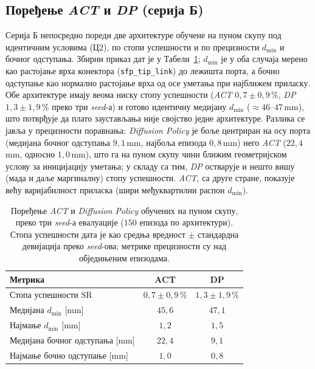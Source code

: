 \documentclass[12pt, a4paper]{article}
\begin{document}
\subsection{Поређење \textit{ACT} и \textit{DP} (серија Б)}
\label{subsec:rez_serija_b}

Серија Б непосредно пореди две архитектуре обучене на пуном скупу под идентичним условима (Ц2), по стопи успешности и по прецизности $d_{\min}$ и бочног одступања.
Збирни приказ дат је у Табели~\ref{tab:rez_serija_b}; $d_{\min}$ је у оба случаја мерено као растојање врха конектора (\texttt{sfp\_tip\_link}) до лежишта порта, а бочно одступање као нормално растојање врха од осе уметања при најближем приласку.
Обе архитектуре имају веома ниску стопу успешности (\textit{ACT} $0{,}7\pm 0{,}9\,\%$, \textit{DP} $1{,}3\pm 1{,}9\,\%$ преко три \textit{seed}-а) и готово идентичну медијану $d_{\min}$ ($\approx 46$–$47$\,mm), што потврђује да плато заустављања није својство једне архитектуре.
Разлика се јавља у прецизности поравнања: \textit{Diffusion Policy} је боље центриран на осу порта (медијана бочног одступања $9{,}1$\,mm, најбоља епизода $0{,}8$\,mm) него \textit{ACT} ($22{,}4$\,mm, односно $1{,}0$\,mm), што га на пуном скупу чини ближим геометријском услову за иницијацију уметања; у складу са тим, \textit{DP} остварује и нешто вишу (мада и даље маргиналну) стопу успешности.
\textit{ACT}, са друге стране, показује већу варијабилност приласка (шири међуквартилни распон $d_{\min}$).

\begin{table}[htbp]
    \caption[Поређење \textit{ACT} и \textit{Diffusion Policy} (пун скуп)]{Поређење \textit{ACT} и \textit{Diffusion Policy} обучених на пуном скупу, преко три \textit{seed}-а евалуације ($150$ епизода по архитектури). Стопа успешности дата је као средња вредност $\pm$ стандардна девијација преко \textit{seed}-ова; метрике прецизности су над обједињеним епизодама.}
    \label{tab:rez_serija_b}
    \centering
    \begin{tabular}{l c c}
        \toprule
        Метрика & ACT & DP \\
        \midrule
        Стопа успешности $\mathrm{SR}$ & $0{,}7\pm 0{,}9\,\%$ & $1{,}3\pm 1{,}9\,\%$ \\
        Медијана $d_{\min}$ [mm] & $45{,}6$ & $47{,}1$ \\
        Најмање $d_{\min}$ [mm] & $1{,}2$ & $1{,}5$ \\
        Медијана бочног одступања [mm] & $22{,}4$ & $9{,}1$ \\
        Најмање бочно одступање [mm] & $1{,}0$ & $0{,}8$ \\
        \bottomrule
    \end{tabular}
\end{table}
\end{document}
